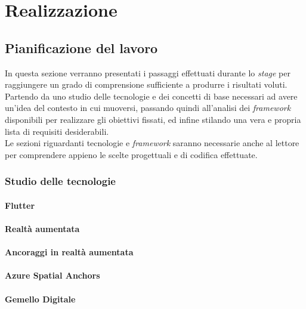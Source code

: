 
\chapter{Realizzazione}
\label{cap:realizzazione}

\section{Pianificazione del lavoro}
In questa sezione verranno presentati i passaggi effettuati durante lo \textit{stage} per raggiungere un grado di comprensione sufficiente a produrre i risultati voluti. Partendo da uno studio delle tecnologie e dei concetti di base necessari ad avere un'idea del contesto in cui muoversi, passando quindi all'analisi dei \textit{framework} disponibili per realizzare gli obiettivi fissati, ed infine stilando una vera e propria lista di requisiti desiderabili.\\
Le sezioni riguardanti tecnologie e \textit{framework} saranno necessarie anche al lettore per comprendere appieno le scelte progettuali e di codifica effettuate.

\subsection{Studio delle tecnologie}
\subsubsection{Flutter}
\subsubsection{Realtà aumentata}
\subsubsection{Ancoraggi in realtà aumentata}
\subsubsection{Azure Spatial Anchors}
\subsubsection{Gemello Digitale}

